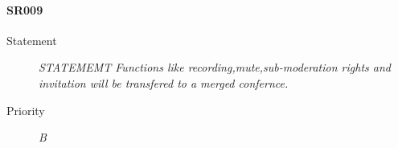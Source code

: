 \paragraph{SR009}
  \begin{description}
  \item [Statement] 
    \textit{ STATEMEMT Functions like recording,mute,sub-moderation rights and invitation will be transfered to a merged confernce.}
  \item [Priority] \textit{B}
\end{description}
  
